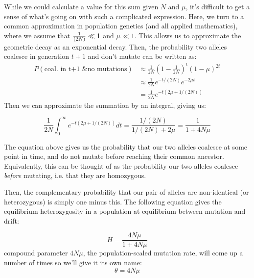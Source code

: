 While we could calculate a value for this sum given $N$ and $\mu$, it's
difficult to get a sense of what's going on with such a complicated expression.
Here, we turn to a common approximation in population genetics (and all applied
mathematics), where we assume that $\nicefrac{1}{(2N)} \ll 1$ and $\mu \ll 1$.
This allows us to approximate the geometric decay as an exponential decay.
Then, the probability two alleles coalesce in generation $t+1$ and don't mutate
can be written as:
%
\begin{align} P(\textrm{coal. in t+1 \& no mutations}) &\approx \frac{1}{2N}
\left(1- \frac{1}{2N} \right)^t \left(1-\mu \right)^{2t} \\ 
& \approx \frac{1}{2N} e^{-t/(2N)} e^{-2\mu t } \\
&=\frac{1}{2N} e^{-t(2\mu+1/(2N))} \end{align} 
%
Then we can approximate the summation by an integral, giving us:
%

\begin{equation}
\frac{1}{2N} \int_0^{\infty} e^{-t(2\mu+1/(2N))} dt =
\frac{1/(2N)}{1/(2N)+2\mu} = \frac{1}{1+4N\mu}
\end{equation}

The equation above gives us the probability that our two alleles coalesce at some point
in time, and do not mutate before reaching their common
ancestor. Equivalently, this can be thought of as the probability our two
alleles coalesce \emph{before} mutating, i.e. that they are homozygous. 

Then, the complementary probability that our pair of alleles are non-identical
(or heterozygous) is simply one minus this. The following equation gives the equilibrium
heterozygosity in a population at equilibrium between mutation and drift:


\begin{equation}
  H = \frac{4N\mu}{1+4N\mu} \label{eqn:hetero}
\end{equation}
 compound parameter $4N\mu$, the population-scaled mutation rate,
will come up a number of times so we'll give it its own name:
\begin{equation}
\theta = 4N\mu
\end{equation}

